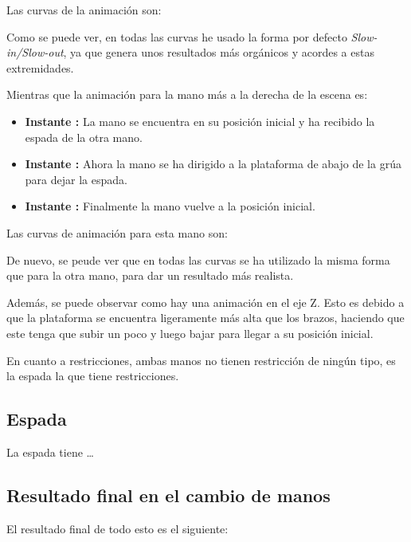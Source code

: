 Las curvas de la animación son:


Como se puede ver, en todas las curvas he usado la forma por defecto \textit{Slow-in/Slow-out}, ya que genera unos resultados más orgánicos y acordes a estas extremidades.


Mientras que la animación para la mano más a la derecha de la escena es: 

\begin{itemize}
    \item \textbf{Instante : }La mano se encuentra en su posición inicial y ha recibido la espada de la otra mano.
    \item \textbf{Instante : }Ahora la mano se ha dirigido a la plataforma de abajo de la grúa para dejar la espada.
    \item \textbf{Instante : }Finalmente la mano vuelve a la posición inicial.
\end{itemize}

Las curvas de animación para esta mano son:


De nuevo, se peude ver que en todas las curvas se ha utilizado la misma forma que para la otra mano, para dar un resultado más realista. 

\bigskip

Además, se puede observar como hay una animación en el eje Z. Esto es debido a que la plataforma se encuentra ligeramente más alta que los brazos, haciendo que este tenga que subir un poco y luego bajar para llegar a su posición inicial.

\bigskip

En cuanto a restricciones, ambas manos no tienen restricción de ningún tipo, es la espada la que tiene restricciones.


\subsection{Espada}


La espada tiene \dots


\subsection{Resultado final en el cambio de manos}

El resultado final de todo esto es el siguiente:

